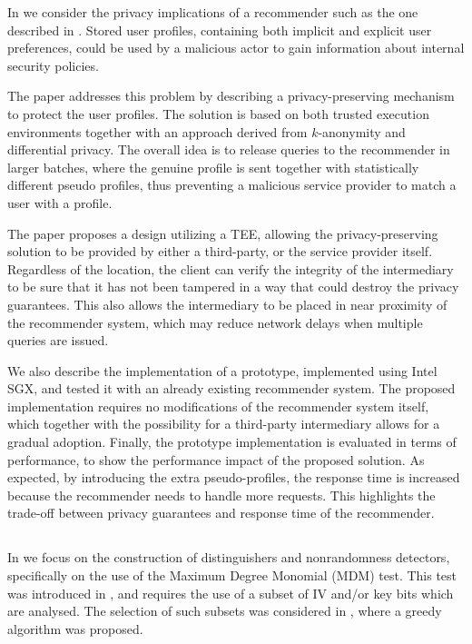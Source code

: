 In  we consider the privacy implications of a recommender such as the one described in .
Stored user profiles, containing both implicit and explicit user preferences, could be used by a malicious actor to gain information about internal security policies.

The paper addresses this problem by describing a privacy-preserving mechanism to protect the user profiles.
The solution is based on both trusted execution environments together with an approach derived from $k$-anonymity and differential privacy.
The overall idea is to release queries to the recommender in larger batches, where the genuine profile is sent together with statistically different pseudo profiles, thus preventing a malicious service provider to match a user with a profile.

The paper proposes a design utilizing a TEE, allowing the privacy-preserving solution to be provided by either a third-party, or the service provider itself.
Regardless of the location, the client can verify the integrity of the intermediary to be sure that it has not been tampered in a way that could destroy the privacy guarantees.
This also allows the intermediary to be placed in near proximity of the recommender system, which may reduce network delays when multiple queries are issued.

We also describe the implementation of a prototype, implemented using Intel SGX, and tested it with an already existing recommender system.
The proposed implementation requires no modifications of the recommender system itself, which together with the possibility for a third-party intermediary allows for a gradual adoption.
Finally, the prototype implementation is evaluated in terms of performance, to show the performance impact of the proposed solution.
As expected, by introducing the extra pseudo-profiles, the response time is increased because the recommender needs to handle more requests.
This highlights the trade-off between privacy guarantees and response time of the recommender.

\subsection{\paperVItitle}

In  we focus on the construction of distinguishers and nonrandomness detectors, specifically on the use of the Maximum Degree Monomial (MDM) test.
This test was introduced in \cite{englund:2007}, and requires the use of a subset of IV and/or key bits which are analysed.
The selection of such subsets was considered in \cite{stankovski:2010}, where a greedy algorithm was proposed.

